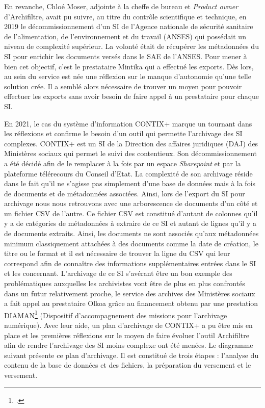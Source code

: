 En revanche, Chloé Moser, adjointe à la cheffe de bureau et \textit{Product owner} d’\gls{Archifiltre}, avait pu suivre, au titre du contrôle scientifique et technique, en 2019 le décommissionnement d’un \gls{SI} de l’Agence nationale de sécurité sanitaire de l'alimentation, de l'environnement et du travail (ANSES) qui possédait un niveau de complexité supérieur. La volonté était de récupérer les métadonnées du \gls{SI} pour enrichir les documents versés dans le \gls{SAE} de l’ANSES. Pour mener à bien cet objectif, c’est le prestataire Mintika qui a effectué les exports. Dès lors, au sein du service est née une réflexion sur le manque d’autonomie qu’une telle solution crée. Il a semblé alors nécessaire de trouver un moyen pour pouvoir effectuer les exports sans avoir besoin de faire appel à un prestataire pour chaque \gls{SI}.


En 2021, le cas du système d’information CONTIX+ marque un tournant dans les réflexions et confirme le besoin d’un outil qui permette l’archivage des \gls{SI} complexes. CONTIX+ est un \gls{SI} de la Direction des affaires juridiques (DAJ) des Ministères sociaux qui permet le suivi des contentieux. Son décommissionnement a été décidé afin de le remplacer à la fois par un espace \textit{Sharepoint} et par la plateforme télérecours du Conseil d’Etat. La complexité de son archivage réside dans le fait qu’il ne s’agisse pas simplement d’une base de données mais à la fois de documents et de métadonnées associées. Ainsi, lors de l’export du \gls{SI} pour archivage nous nous retrouvons avec une arborescence de documents d’un côté et un fichier CSV de l’autre. Ce fichier CSV est constitué d’autant de colonnes qu’il y a de catégories de métadonnées à extraire de ce \gls{SI} et autant de lignes qu’il y a de documents extraits. Ainsi, les documents ne sont associés qu’aux métadonnées minimum classiquement attachées à des documents comme la date de création, le titre ou le format et il est nécessaire de trouver la ligne du CSV qui leur correspond afin de connaître des informations supplémentaires entrées dans le \gls{SI} et les concernant. L’archivage de ce \gls{SI} s’avérant être un bon exemple des problématiques auxquelles les archivistes vont être de plus en plus confrontés dans un futur relativement proche, le service des archives des Ministères sociaux a fait appel au prestataire Olkoa grâce au financement obtenu par une prestation DIAMAN\footcite{noauthor_appel_2024} (Dispositif d'accompagnement des missions pour l'archivage numérique). Avec leur aide, un plan d’archivage de CONTIX+ a pu être mis en place et les premières réflexions sur le moyen de faire évoluer l’outil Archifiltre afin de rendre l’archivage des \gls{SI} moins complexe ont été menées. Le diagramme suivant présente ce plan d'archivage. Il est constitué de trois étapes : l'analyse du contenu de la base de données et des fichiers, la préparation du versement et le versement.

